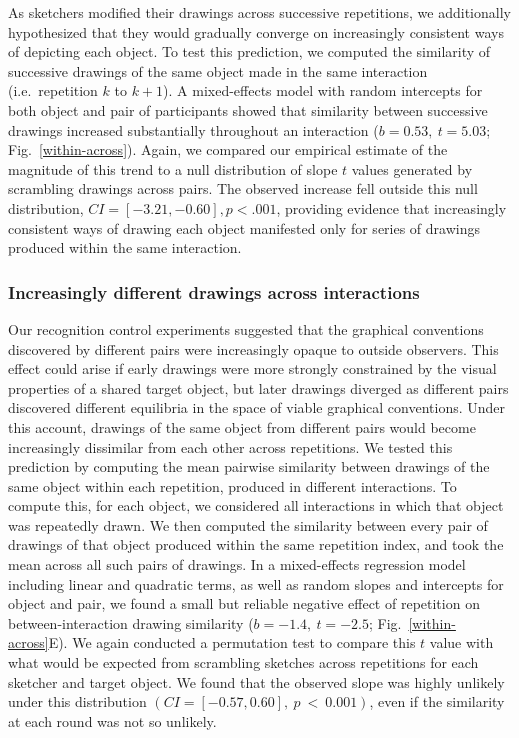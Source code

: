 \documentclass[10pt,letterpaper]{article}
\begin{document}
As sketchers modified their drawings across successive repetitions, we additionally hypothesized that they would gradually converge on increasingly consistent ways of depicting each object.
To test this prediction, we computed the similarity of successive drawings of the same object made in the same interaction (i.e.~repetition $k$ to $k+1$). %
A mixed-effects model with random intercepts for both object and pair of participants showed that similarity between successive drawings increased substantially throughout an interaction ($b = 0.53,~t = 5.03$; Fig.~\ref{within-across}).
Again, we compared our empirical estimate of the magnitude of this trend to a null distribution of slope $t$ values generated by scrambling drawings across pairs.%
The observed increase fell outside this null distribution, $CI = [-3.21, -0.60], p < .001$, providing evidence that increasingly consistent ways of drawing each object manifested only for series of drawings produced within the same interaction.

\subsubsection{Increasingly different drawings across interactions}

Our recognition control experiments suggested that the graphical conventions discovered by different pairs were increasingly opaque to outside observers.
This effect could arise if early drawings were more strongly constrained by the visual properties of a shared target object, but later drawings diverged as different pairs discovered different equilibria in the space of viable graphical conventions.
Under this account, drawings of the same object from different pairs would become increasingly dissimilar from each other across repetitions.
We tested this prediction by computing the mean pairwise similarity between drawings of the same object within each repetition, produced in different interactions.
To compute this, for each object, we considered all interactions in which that object was repeatedly drawn.
We then computed the similarity between every pair of drawings of that object produced within the same repetition index, and took the mean across all such pairs of drawings.
In a mixed-effects regression model including linear and quadratic terms, as well as random slopes and intercepts for object and pair, we found a small but reliable negative effect of repetition on between-interaction drawing similarity ($b = -1.4, ~t = -2.5$; Fig.~\ref{within-across}E). %
We again conducted a permutation test to compare this $t$ value with what would be expected from scrambling sketches across repetitions for each sketcher and target object.
We found that the observed slope was highly unlikely under this distribution $(CI = [-0.57, 0.60],~p~<~0.001)$, even if the similarity at each round was not so unlikely.
\end{document}
